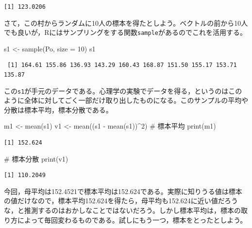 \documentclass[
  a4paper,
]{ltjsbook}
\newenvironment{Shaded}{\begin{snugshade}}{\end{snugshade}}
\newcommand{\AttributeTok}[1]{\textcolor[rgb]{0.40,0.45,0.13}{#1}}
\newcommand{\CommentTok}[1]{\textcolor[rgb]{0.37,0.37,0.37}{#1}}
\newcommand{\DecValTok}[1]{\textcolor[rgb]{0.68,0.00,0.00}{#1}}
\newcommand{\FunctionTok}[1]{\textcolor[rgb]{0.28,0.35,0.67}{#1}}
\newcommand{\NormalTok}[1]{\textcolor[rgb]{0.00,0.23,0.31}{#1}}
\newcommand{\OtherTok}[1]{\textcolor[rgb]{0.00,0.23,0.31}{#1}}
\newcommand{\SpecialCharTok}[1]{\textcolor[rgb]{0.37,0.37,0.37}{#1}}
\begin{document}
\begin{verbatim}
[1] 123.0206
\end{verbatim}

さて，この村からランダムに10人の標本を得たとしよう。ベクトルの前から10人でも良いが，Rにはサンプリングをする関数\texttt{sample}があるのでこれを活用する。

\begin{Shaded}
\begin{Highlighting}[]
\NormalTok{s1 }\OtherTok{\textless{}{-}} \FunctionTok{sample}\NormalTok{(Po, }\AttributeTok{size =} \DecValTok{10}\NormalTok{)}
\NormalTok{s1}
\end{Highlighting}
\end{Shaded}

\begin{verbatim}
 [1] 164.61 155.86 136.93 143.29 160.43 168.87 151.50 155.17 153.71 135.87
\end{verbatim}

この\texttt{s1}が手元のデータである。心理学の実験でデータを得る，というのはこのように全体に対してごく一部だけ取り出したものになる。このサンプルの平均や分散は標本平均，標本分散である。

\begin{Shaded}
\begin{Highlighting}[]
\NormalTok{m1 }\OtherTok{\textless{}{-}} \FunctionTok{mean}\NormalTok{(s1)}
\NormalTok{v1 }\OtherTok{\textless{}{-}} \FunctionTok{mean}\NormalTok{((s1 }\SpecialCharTok{{-}} \FunctionTok{mean}\NormalTok{(s1))}\SpecialCharTok{\^{}}\DecValTok{2}\NormalTok{)}
\CommentTok{\# 標本平均}
\FunctionTok{print}\NormalTok{(m1)}
\end{Highlighting}
\end{Shaded}

\begin{verbatim}
[1] 152.624
\end{verbatim}

\begin{Shaded}
\begin{Highlighting}[]
\CommentTok{\# 標本分散}
\FunctionTok{print}\NormalTok{(v1)}
\end{Highlighting}
\end{Shaded}

\begin{verbatim}
[1] 110.2049
\end{verbatim}

今回，母平均は152.4521で標本平均は152.624である。実際に知りうる値は標本の値だけなので，標本平均152.624を得たら，母平均も152.624に近い値だろうな，と推測するのはおかしなことではないだろう。しかし標本平均は，標本の取り方によって毎回変わるものである。試しにもう一つ，標本をとったとしよう。
\end{document}
